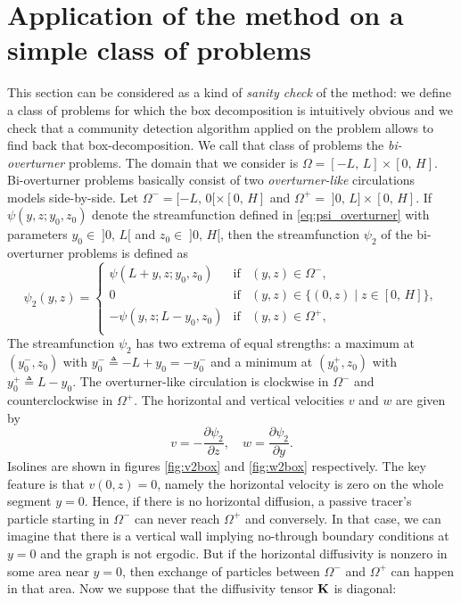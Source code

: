 \section{Application of the method on a simple class of problems}
This section can be considered as a kind of \textit{sanity check} of the method: we define a class of problems for which the box decomposition is intuitively obvious and we check that a community detection algorithm applied on the problem allows to find back that box-decomposition. We call that class of problems the \textit{bi-overturner} problems. The domain that we consider is $\Omega = [-L,\,L]\times[0,\,H]$. Bi-overturner problems basically consist of two \textit{overturner-like} circulations models side-by-side. Let $\Omega^- = [-L,\,0[\times[0,\,H]$ and $\Omega^+ =\; ]0,\,L]\times[0,\,H]$. If $\psi(y,z;y_0,z_0)$ denote the streamfunction defined in \eqref{eq:psi_overturner} with parameters $y_0 \in\; ]0,\,L[$ and $z_0 \in\; ]0,\,H[$, then the streamfunction $\psi_2$ of the bi-overturner problems is defined as
\begin{equation} \label{eq:psi_2box}
	\psi_2(y,z) = \left\{ 
		\begin{array}{lrr}
			\psi(L+y,z;y_0,z_0) & \mbox{if} & (y,z) \in \Omega^-,\\
			0 & \mbox{if} & (y,z) \in \{(0,z)\;|\;z \in [0,\,H]\},\\
			-\psi(y,z;L-y_0,z_0) & \mbox{if} & (y,z) \in \Omega^+,\\
		\end{array}
	\right.
\end{equation}
The streamfunction $\psi_2$ has two extrema of equal strengths: a maximum at $(y_0^-,z_0)$ with $y_0^- \triangleq -L+y_0 = -y_0^-$ and a minimum at $(y_0^+,z_0)$ with $y_0^+ \triangleq L-y_0$. The overturner-like circulation is clockwise in $\Omega^-$ and counterclockwise in $\Omega^+$. The horizontal and vertical velocities $v$ and $w$ are given by
\begin{equation} \label{eq:u-psi_2box}
	v = -\frac{\partial \psi_2}{\partial z}, \quad w = \frac{\partial \psi_2}{\partial y}.
\end{equation}
 Isolines are shown in figures \ref{fig:v2box} and \ref{fig:w2box} respectively. The key feature is that $v(0,z) = 0$, namely the horizontal velocity is zero on the whole segment $y = 0$. Hence, if there is no horizontal diffusion, a passive tracer's particle starting in $\Omega^-$ can never reach $\Omega^+$ and conversely. In that case, we can imagine that there is a vertical wall implying no-through boundary conditions at $y=0$ and the graph is not ergodic. But if the horizontal diffusivity is nonzero in some area near $y=0$, then exchange of particles between $\Omega^-$ and $\Omega^+$ can happen in that area. Now we suppose that the diffusivity tensor $\mathbf K$ is diagonal:
